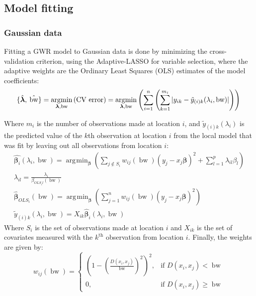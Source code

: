\documentclass[10pt]{amsart}
\DeclareMathOperator*{\argmin}{\arg\!\min}
\DeclareMathOperator*{\bw}{\mbox{bw}}
\newcommand{\vect}[1]{\boldsymbol{#1}}
\begin{document}
		
	\subsection{Model fitting}
		\subsubsection{Gaussian data}
		Fitting a GWR model to Gaussian data is done by minimizing the cross-validation criterion, using the Adaptive-LASSO for variable selection, where the adaptive weights are the Ordinary Least Squares (OLS) estimates of the model coefficients:
		 \[
			\{ \hat{\vect{\lambda}}, \: \hat{\bw} \} = \argmin_{\vect{\lambda}, \text{bw}} \left( \mbox{CV error} \right)  = \argmin_{\vect{\lambda}, \text{bw}} \left( \sum_{i = 1}^n \left( \sum_{k=1}^{m_i} |y_{ik}-\tilde{y}_{(i)k}(\lambda_i, \bw)| \right) \right)\\
		\]
		
		Where $m_i$ is the number of observations made at location $i$, and $\tilde{y}_{(i)k}(\lambda_i)$ is the predicted value of the $k$th observation at location $i$ from the local model that was fit by leaving out all observations from location $i$:		
		\begin{gather*}
			\hat{\vect{\beta}_i}(\lambda_i, \bw) = \argmin_{\vect{\beta}} \left( \sum_{j \notin S_i} w_{ij}(\bw)(y_j - x_j \vect{\beta})^2  +  \sum_{l=1}^p \lambda_{il} \beta_l \right)\\
			\lambda_{il} = \frac{\lambda_i}{\beta_{OLS_i l}(\bw)}\\
			\hat{\vect{\beta}}_{OLS_i}(\bw) = \argmin_{\vect{\beta}} \left( \sum_{j=1}^{n} w_{ij}(\bw)(y_j - x_j \vect{\beta})^2\right)\\
			\tilde{y}_{(i)k}(\lambda_i, \bw) = X_{ik} \hat{\vect{\beta}}_i(\lambda_i, \bw)
		\end{gather*}
		Where $S_i$ is the set of observations made at location $i$ and $X_{ik}$ is the set of covariates measured with the $k^{\text{th}}$ observation from location $i$. Finally, the weights are given by:
		\[
			w_{ij}(\bw) =  \begin{cases} \left(1-\left(\frac{D(x_i,x_j)}{\bw}\right)^2\right)^2, & \mbox{if } D(x_i,x_j) < \bw \\
			0, & \mbox{if }D(x_i,x_j) \ge \bw \end{cases}
		\]
		
\end{document}
